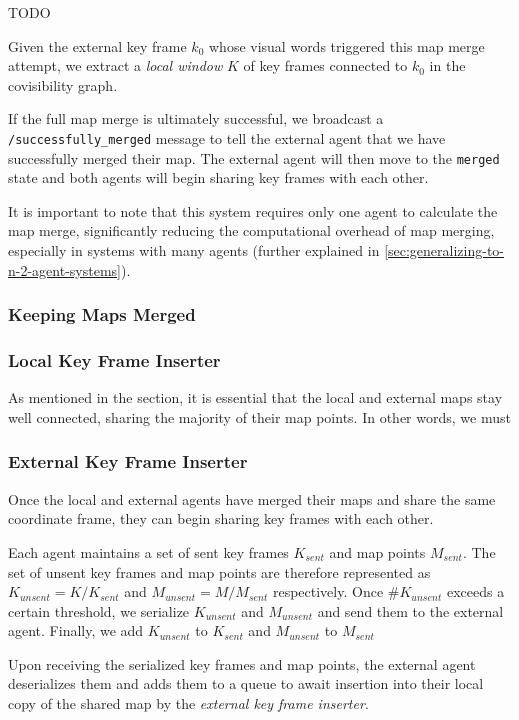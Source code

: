 TODO

Given the external key frame $k_0$ whose visual words triggered this map merge attempt, we extract a \textit{local window} $K$ of key frames connected to $k_0$ in the covisibility graph.

If the full map merge is ultimately successful, we broadcast a \texttt{/successfully\_merged} message to tell the external agent that we have successfully merged their map. The external agent will then move to the \texttt{merged} state and both agents will begin sharing key frames with each other.

It is important to note that this system requires only one agent to calculate the map merge, significantly reducing the computational overhead of map merging, especially in systems with many agents (further explained in \autoref{sec:generalizing-to-n-2-agent-systems}).

\subsubsection{Keeping Maps Merged}

\subsubsection{Local Key Frame Inserter}
\label{sec:local-key-frame-inserter}
As mentioned in the  section, it is essential that the local and external maps stay well connected, sharing the majority of their map points. In other words, we must

\subsubsection{External Key Frame Inserter}
\label{sec:external-key-frame-inserter}
Once the local and external agents have merged their maps and share the same coordinate frame, they can begin sharing key frames with each other.

Each agent maintains a set of sent key frames $K_{sent}$ and map points $M_{sent}$. The set of unsent key frames and map points are therefore represented as $K_{unsent} = K / K_{sent}$ and $M_{unsent} = M / M_{sent}$ respectively. Once $\#K_{unsent}$ exceeds a certain threshold, we serialize $K_{unsent}$ and $M_{unsent}$ and send them to the external agent. Finally, we add $K_{unsent}$ to $K_{sent}$ and $M_{unsent}$ to $M_{sent}$

Upon receiving the serialized key frames and map points, the external agent deserializes them and adds them to a queue to await insertion into their local copy of the shared map by the \textit{external key frame inserter}.

